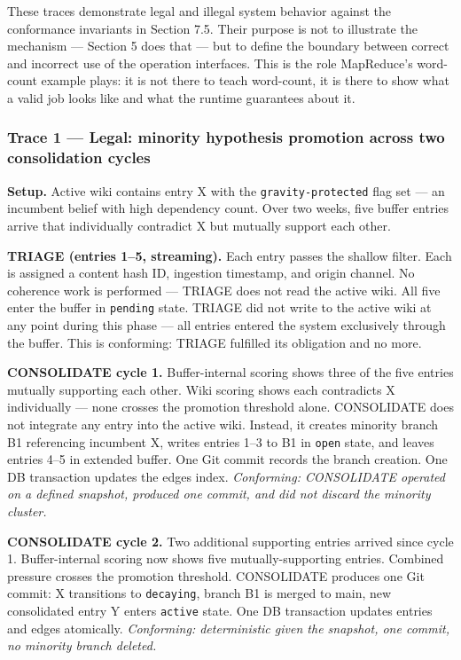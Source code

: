 \documentclass[
  11pt,
]{article}
\begin{document}
These traces demonstrate legal and illegal system behavior against the
conformance invariants in Section 7.5. Their purpose is not to
illustrate the mechanism --- Section 5 does that --- but to define the
boundary between correct and incorrect use of the operation interfaces.
This is the role MapReduce's word-count example plays: it is not there
to teach word-count, it is there to show what a valid job looks like and
what the runtime guarantees about it.

\hypertarget{trace-1-legal-minority-hypothesis-promotion-across-two-consolidation-cycles}{%
\subsubsection{Trace 1 --- Legal: minority hypothesis promotion across
two consolidation
cycles}\label{trace-1-legal-minority-hypothesis-promotion-across-two-consolidation-cycles}}

\textbf{Setup.} Active wiki contains entry X with the
\texttt{gravity-protected} flag set --- an incumbent belief with high
dependency count. Over two weeks, five buffer entries arrive that
individually contradict X but mutually support each other.

\textbf{TRIAGE (entries 1--5, streaming).} Each entry passes the shallow
filter. Each is assigned a content hash ID, ingestion timestamp, and
origin channel. No coherence work is performed --- TRIAGE does not read
the active wiki. All five enter the buffer in \texttt{pending} state.
TRIAGE did not write to the active wiki at any point during this phase
--- all entries entered the system exclusively through the buffer. This
is conforming: TRIAGE fulfilled its obligation and no more.

\textbf{CONSOLIDATE cycle 1.} Buffer-internal scoring shows three of the
five entries mutually supporting each other. Wiki scoring shows each
contradicts X individually --- none crosses the promotion threshold
alone. CONSOLIDATE does not integrate any entry into the active wiki.
Instead, it creates minority branch B1 referencing incumbent X, writes
entries 1--3 to B1 in \texttt{open} state, and leaves entries 4--5 in
extended buffer. One Git commit records the branch creation. One DB
transaction updates the edges index. \emph{Conforming: CONSOLIDATE
operated on a defined snapshot, produced one commit, and did not discard
the minority cluster.}

\textbf{CONSOLIDATE cycle 2.} Two additional supporting entries arrived
since cycle 1. Buffer-internal scoring now shows five
mutually-supporting entries. Combined pressure crosses the promotion
threshold. CONSOLIDATE produces one Git commit: X transitions to
\texttt{decaying}, branch B1 is merged to main, new consolidated entry Y
enters \texttt{active} state. One DB transaction updates entries and
edges atomically. \emph{Conforming: deterministic given the snapshot,
one commit, no minority branch deleted.}
\end{document}
